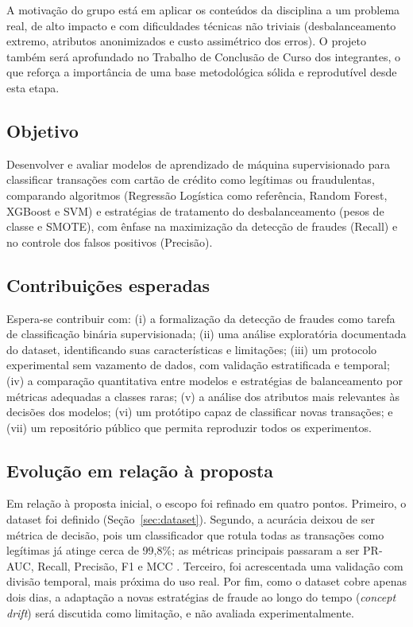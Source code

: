 \documentclass[12pt]{article}
\begin{document}
A motivação do grupo está em aplicar os conteúdos da disciplina a um problema
real, de alto impacto e com dificuldades técnicas não triviais (desbalanceamento
extremo, atributos anonimizados e custo assimétrico dos erros). O projeto também
será aprofundado no Trabalho de Conclusão de Curso dos integrantes, o que
reforça a importância de uma base metodológica sólida e reprodutível desde esta
etapa.

\subsection{Objetivo}

Desenvolver e avaliar modelos de aprendizado de máquina supervisionado para
classificar transações com cartão de crédito como legítimas ou fraudulentas,
comparando algoritmos (Regressão Logística como referência, Random Forest,
XGBoost e SVM) e estratégias de tratamento do desbalanceamento (pesos de classe
e SMOTE), com ênfase na maximização da detecção de fraudes (Recall) e no
controle dos falsos positivos (Precisão).

\subsection{Contribuições esperadas}

Espera-se contribuir com: (i) a formalização da detecção de fraudes como tarefa
de classificação binária supervisionada; (ii) uma análise exploratória
documentada do dataset, identificando suas características e limitações; (iii)
um protocolo experimental sem vazamento de dados, com validação estratificada e
temporal; (iv) a comparação quantitativa entre modelos e estratégias de
balanceamento por métricas adequadas a classes raras; (v) a análise dos
atributos mais relevantes às decisões dos modelos; (vi) um protótipo capaz de
classificar novas transações; e (vii) um repositório público que permita
reproduzir todos os experimentos.

\subsection{Evolução em relação à proposta}

Em relação à proposta inicial, o escopo foi refinado em quatro pontos. Primeiro,
o dataset foi definido (Seção~\ref{sec:dataset}). Segundo, a acurácia deixou de
ser métrica de decisão, pois um classificador que rotula todas as transações
como legítimas já atinge cerca de 99,8\%; as métricas principais passaram a ser
PR-AUC, Recall, Precisão, F1 e MCC \cite{saito:2015,chicco:2020}. Terceiro, foi
acrescentada uma validação com divisão temporal, mais próxima do uso real. Por
fim, como o dataset cobre apenas dois dias, a adaptação a novas estratégias de
fraude ao longo do tempo (\emph{concept drift}) será discutida como limitação,
e não avaliada experimentalmente.
\end{document}

